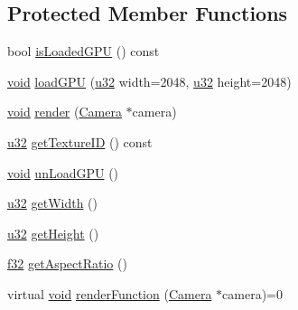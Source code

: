 \subsection*{Protected Member Functions}
\begin{DoxyCompactItemize}
\item 
bool \mbox{\hyperlink{classnjli_1_1_abstract_frame_buffer_object_a166068d3dbc251ce28daf2564fdb2e99}{is\+Loaded\+G\+PU}} () const
\item 
\mbox{\hyperlink{_thread_8h_af1e856da2e658414cb2456cb6f7ebc66}{void}} \mbox{\hyperlink{classnjli_1_1_abstract_frame_buffer_object_a9fa4ab667a74a7a23b18ae3418e56f7d}{load\+G\+PU}} (\mbox{\hyperlink{_util_8h_a10e94b422ef0c20dcdec20d31a1f5049}{u32}} width=2048, \mbox{\hyperlink{_util_8h_a10e94b422ef0c20dcdec20d31a1f5049}{u32}} height=2048)
\item 
\mbox{\hyperlink{_thread_8h_af1e856da2e658414cb2456cb6f7ebc66}{void}} \mbox{\hyperlink{classnjli_1_1_abstract_frame_buffer_object_ababe9973dc3593e158adf12033f66b71}{render}} (\mbox{\hyperlink{classnjli_1_1_camera}{Camera}} $\ast$camera)
\item 
\mbox{\hyperlink{_util_8h_a10e94b422ef0c20dcdec20d31a1f5049}{u32}} \mbox{\hyperlink{classnjli_1_1_abstract_frame_buffer_object_ae5fdf18cef91c86d8e1cf97d4728d144}{get\+Texture\+ID}} () const
\item 
\mbox{\hyperlink{_thread_8h_af1e856da2e658414cb2456cb6f7ebc66}{void}} \mbox{\hyperlink{classnjli_1_1_abstract_frame_buffer_object_a66d234282238e25ef245d64d087be8d8}{un\+Load\+G\+PU}} ()
\item 
\mbox{\hyperlink{_util_8h_a10e94b422ef0c20dcdec20d31a1f5049}{u32}} \mbox{\hyperlink{classnjli_1_1_abstract_frame_buffer_object_aa4ab66fbdcb04f1834d1dc05b4c7a10c}{get\+Width}} ()
\item 
\mbox{\hyperlink{_util_8h_a10e94b422ef0c20dcdec20d31a1f5049}{u32}} \mbox{\hyperlink{classnjli_1_1_abstract_frame_buffer_object_a95ae9779550ed7496011f859ec3d4766}{get\+Height}} ()
\item 
\mbox{\hyperlink{_util_8h_a5f6906312a689f27d70e9d086649d3fd}{f32}} \mbox{\hyperlink{classnjli_1_1_abstract_frame_buffer_object_aded6f9fc4da10af752cf90a97aaa751d}{get\+Aspect\+Ratio}} ()
\item 
virtual \mbox{\hyperlink{_thread_8h_af1e856da2e658414cb2456cb6f7ebc66}{void}} \mbox{\hyperlink{classnjli_1_1_abstract_frame_buffer_object_aa75a537f5745e4be8f749892d195b43c}{render\+Function}} (\mbox{\hyperlink{classnjli_1_1_camera}{Camera}} $\ast$camera)=0
\end{DoxyCompactItemize}
